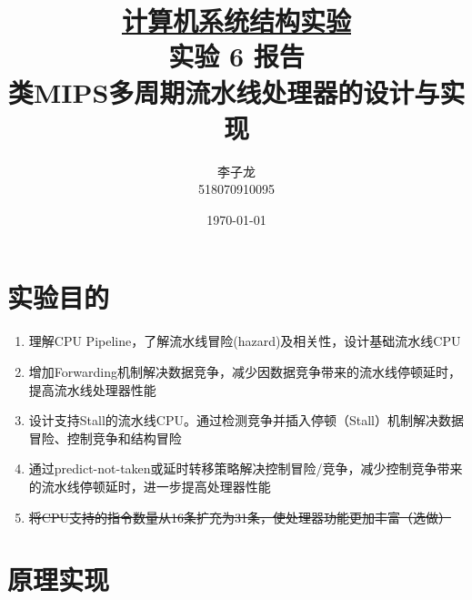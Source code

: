 \documentclass[a4paper,UTF8]{ctexart}
\begin{document}
\title{\normalsize \underline{计算机系统结构实验}\\\LARGE 实验 6 报告\\\vspace*{1em}\normalsize 类MIPS多周期流水线处理器的设计与实现}
\author{李子龙\\ 518070910095}
\date{\today}
\maketitle
\tableofcontents
\clearpage

\section{实验目的}

\begin{enumerate}
    \item 理解CPU Pipeline，了解流水线冒险(hazard)及相关性，设计基础流水线CPU
    \item 增加Forwarding机制解决数据竞争，减少因数据竞争带来的流水线停顿延时，提高流水线处理器性能
    \item 设计支持Stall的流水线CPU。通过检测竞争并插入停顿（Stall）机制解决数据冒险、控制竞争和结构冒险
    \item 通过predict-not-taken或延时转移策略解决控制冒险/竞争，减少控制竞争带来的流水线停顿延时，进一步提高处理器性能
    \item \sout{将CPU支持的指令数量从16条扩充为31条，使处理器功能更加丰富（选做）}
\end{enumerate}

\section{原理实现}
\end{document}
